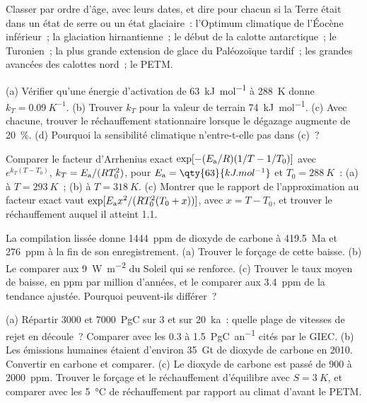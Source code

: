 \begin{exercise}[$\star$]\label{exo:b2:deep-time-climate:4}
Classer par ordre d'âge, avec leurs dates, et dire pour chacun si la Terre était dans un état de serre ou
un état glaciaire~: l'Optimum climatique de l'Éocène inférieur~; la glaciation hirnantienne~; le début de la
calotte antarctique~; le Turonien~; la plus grande extension de glace du Paléozoïque tardif~; les grandes avancées
des calottes nord~; le PETM.
\end{exercise}

\begin{exercise}[$\star\star$]\label{exo:b2:deep-time-climate:5}
(a) Vérifier qu'une énergie d'activation de \qty{63}{kJ.mol^{-1}} à \qty{288}{K} donne $k_T =
\qty{0.09}{K^{-1}}$. (b) Trouver $k_T$ pour la valeur de terrain \qty{74}{kJ.mol^{-1}}. (c) Avec chacune, trouver le
réchauffement stationnaire lorsque le dégazage augmente de \qty{20}{\percent}. (d) Pourquoi la sensibilité climatique
n'entre-t-elle pas dans (c)~?
\end{exercise}

\begin{exercise}[$\star\star$]\label{exo:b2:deep-time-climate:6}
Comparer le facteur d'Arrhenius exact $\exp[-(E_{\text a}/R)(1/T - 1/T_0)]$ avec $e^{k_T(T -
T_0)}$, $k_T = E_{\text a}/(RT_0^2)$, pour $E_{\text a} = \qty{63}{kJ.mol^{-1}}$ et $T_0 =
\qty{288}{K}$~: (a) à $T = \qty{293}{K}$~; (b) à $T = \qty{318}{K}$. (c) Montrer que le rapport de l'approximation au
facteur exact vaut $\exp[E_{\text a}x^2/(RT_0^2(T_0 + x))]$, avec $x = T - T_0$, et trouver le réchauffement
auquel il atteint 1.1.
\end{exercise}

\begin{exercise}[$\star\star$]\label{exo:b2:deep-time-climate:7}
La compilation lissée donne \qty{1444}{ppm} de dioxyde de carbone à \qty{419.5}{Ma} et \qty{276}{ppm} à la fin de
son enregistrement. (a) Trouver le forçage de cette baisse. (b) Le comparer aux \qty{9}{W.m^{-2}} du Soleil qui se renforce.
(c) Trouver le taux moyen de baisse, en ppm par million d'années, et le comparer aux \qty{3.4}{ppm} de la tendance ajustée.
Pourquoi peuvent-ils différer~?
\end{exercise}

\begin{exercise}[$\star\star$]\label{exo:b2:deep-time-climate:8}
(a) Répartir \num{3000} et \qty{7000}{PgC} sur 3 et sur \qty{20}{ka}~: quelle plage de vitesses de rejet
en découle~? Comparer avec les 0.3 à \qty{1.5}{PgC.an^{-1}} cités par le GIEC. (b) Les émissions humaines étaient
d'environ \qty{35}{Gt} de dioxyde de carbone en 2010. Convertir en carbone et comparer. (c) Le dioxyde de carbone
est passé de 900 à \qty{2000}{ppm}. Trouver le forçage et le réchauffement d'équilibre avec $S =
\qty{3}{K}$, et comparer avec les \qty{5}{\celsius} de réchauffement par rapport au climat d'avant le PETM.
\end{exercise}

